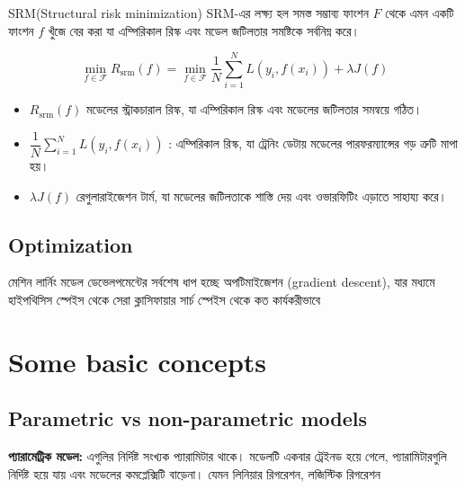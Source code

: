 \documentclass[graybox, envcountchap, twocolumn]{styles/svmult}
\begin{document}
\begin{definition}
SRM(Structural risk minimization)
SRM-এর লক্ষ্য হল সমস্ত সম্ভাব্য ফাংশন $F$ থেকে এমন একটি ফাংশন $f$ খুঁজে বের করা যা এম্পিরিকাল রিস্ক এবং মডেল জটিলতার সমষ্টিকে সর্বনিম্ন করে। 

\begin{equation}
\min\limits _{f \in \mathcal{F}} R_{\mathrm{srm}}(f)=\min\limits _{f \in \mathcal{F}} \dfrac{1}{N}\sum\limits_{i=1}^{N} L\left(y_i,f(x_i)\right) +\lambda J(f)
\end{equation}


\begin{itemize}
    \item $R_{\mathrm{srm}}(f)$ মডেলের স্ট্রাকচারাল রিস্ক, যা এম্পিরিকাল রিস্ক এবং মডেলের জটিলতার সমন্বয়ে গঠিত।
    \item $\dfrac{1}{N}\sum\limits_{i=1}^{N} L\left(y_i,f(x_i)\right)$ : এম্পিরিকাল রিস্ক, যা ট্রেনিং ডেটায় মডেলের পারফরম্যান্সের গড় ত্রুটি মাপা হয়।
    \item $\lambda J(f)$ রেগুলারাইজেশন টার্ম, যা মডেলের জটিলতাকে শাস্তি দেয় এবং ওভারফিটিং এড়াতে সাহায্য করে।
\end{itemize}
\end{definition}


\subsection{Optimization}

মেশিন লার্নিং মডেল ডেভেলপমেন্টের সর্বশেষ ধাপ হচ্ছে অপটিমাইজেশন (gradient descent), যার মধ্যমে হাইপথিসিস স্পেইস থেকে সেরা ক্লাসিফায়ার সার্চ স্পেইস থেকে কত কার্যকরীভাবে  




\section{Some basic concepts}


\subsection{Parametric vs non-parametric models}

\textbf{প্যারামেট্রিক মডেল:} এগুলির নির্দিষ্ট সংখ্যক প্যারামিটার থাকে।  মডেলটি একবার ট্রেইনড হয়ে গেলে, প্যারামিটারগুলি নির্দিষ্ট হয়ে যায় এবং মডেলের কমপ্লেক্সিটি বাড়েনা। যেমন লিনিয়ার রিগরেশন, লজিস্টিক রিগরেশন
\end{document}
